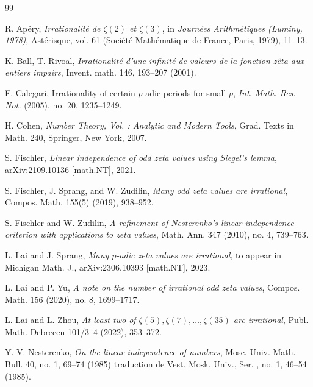 \documentclass[12pt]{article}
\numberwithin{equation}{section}
\begin{document}
\begin{thebibliography}{99}

 R. Ap{\'e}ry, \textit{Irrationalit{\'e} de $\zeta(2)$ et $\zeta(3)$}, in \textit{Journ{\'e}es Arithm{\'e}tiques (Luminy, 1978)}, Ast{\'e}risque, vol. 61 (Soci{\'e}t{\'e} Math{\'e}matique de France, Paris, 1979), 11--13.

 K. Ball, T. Rivoal, \textit{Irrationalité d’une infinité de valeurs de la fonction zêta aux entiers impairs}, Invent. math. 146, 193–207 (2001).

 F. Calegari, Irrationality of certain $p$-adic periods for small $p$, {\it Int. Math. Res. Not.} (2005), no. 20, 1235–1249.

 H. Cohen, \textit{Number Theory, Vol. \uppercase\expandafter{}: Analytic and Modern Tools}, Grad. Texts in Math. 240, Springer, New York, 2007.

 S. Fischler, \textit{Linear independence of odd zeta values using Siegel's lemma}, arXiv:2109.10136 [math.NT], 2021.

  S. Fischler, J. Sprang, and W. Zudilin, \textit{Many odd zeta values are irrational}, Compos. Math. 155(5) (2019), 938--952.

 S. Fischler and W. Zudilin, \textit{A refinement of Nesterenko's linear independence criterion with applications to zeta values}, Math. Ann. 347 (2010), no. 4, 739--763.

 L. Lai and J. Sprang, \textit{Many $p$-adic zeta values are irrational}, to appear in Michigan Math. J., arXiv:2306.10393 [math.NT], 2023.

 L. Lai and P. Yu, \textit{A note on the number of irrational odd zeta values}, Compos. Math. 156 (2020), no. 8, 1699--1717.

 L. Lai and L. Zhou, \textit{At least two of $\zeta(5),\zeta(7),\ldots,\zeta(35)$ are irrational}, Publ. Math. Debrecen 101/3--4 (2022), 353--372.


 Y. V. Nesterenko, \textit{On the linear independence of numbers}, Mosc. Univ. Math. Bull. 40, no. 1, 69--74 (1985) traduction de Vest. Mosk. Univ., Ser. {}, no. 1, 46--54 (1985).


\end{thebibliography}
\end{document}
